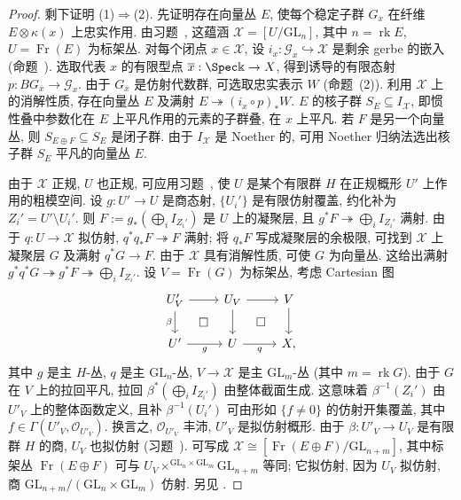 \begin{proof}
剩下证明 (1)$\Rightarrow$(2). 先证明存在向量丛 $E$, 使每个稳定子群 $G_x$ 在纤维 $E\otimes\kappa(x)$ 上忠实作用. 由习题~, 这蕴涵 $\mathcal X=[U/\mathrm{GL}_n]$, 其中 $n=\operatorname{rk}E$, $U=\operatorname{Fr}(E)$ 为标架丛. 对每个闭点 $x\in\mathcal X$, 设 $i_x:\mathcal G_x\hookrightarrow\mathcal X$ 是剩余 gerbe 的嵌入 (命题~). 选取代表 $x$ 的有限型点 $\overline x:\Spec\Bbbk\to\mathcal X$, 得到诱导的有限态射 $p:BG_{\overline x}\to\mathcal G_x$. 由于 $G_{\overline x}$ 是仿射代数群, 可选取忠实表示 $W$ (命题~(2)). 利用 $\mathcal X$ 上的消解性质, 存在向量丛 $E$ 及满射 $E\twoheadrightarrow(i_x\circ p)_*W$. $E$ 的核子群 $S_E\subseteq I_{\mathcal X}$, 即惯性叠中参数化在 $E$ 上平凡作用的元素的子群叠, 在 $x$ 上平凡. 若 $F$ 是另一个向量丛, 则 $S_{E\oplus F}\subseteq S_E$ 是闭子群. 由于 $I_{\mathcal X}$ 是 Noether 的, 可用 Noether 归纳法选出核子群 $S_E$ 平凡的向量丛 $E$.

由于 $\mathcal X$ 正规, $U$ 也正规, 可应用习题~, 使 $U$ 是某个有限群 $H$ 在正规概形 $U'$ 上作用的粗模空间. 设 $g:U'\to U$ 是商态射, $\{U_i'\}$ 是有限仿射覆盖, 约化补为 $Z_i'=U'\setminus U_i'$. 则 $F:=g_*(\bigoplus_iI_{Z_i'})$ 是 $U$ 上的凝聚层, 且 $g^*F\twoheadrightarrow\bigoplus_iI_{Z_i'}$ 满射. 由于 $q:U\to\mathcal X$ 拟仿射, $q^*q_*F\twoheadrightarrow F$ 满射; 将 $q_*F$ 写成凝聚层的余极限, 可找到 $\mathcal X$ 上凝聚层 $G$ 及满射 $q^*G\to F$. 由于 $\mathcal X$ 具有消解性质, 可使 $G$ 为向量丛. 这给出满射 $g^*q^*G\twoheadrightarrow g^*F\twoheadrightarrow\bigoplus_iI_{Z_i'}$. 设 $V=\operatorname{Fr}(G)$ 为标架丛, 考虑 Cartesian 图
\[
\begin{tikzcd}[ampersand replacement=\&]
U'_V\arrow[r]\arrow[d,"{\beta}"']\&U_V\arrow[r]\arrow[d]\&V\arrow[d]\\
U'\arrow[r,"{g}"']\arrow[ur,phantom,"{\square}"]\&U\arrow[r,"{q}"']\arrow[ur,phantom,"{\square}"]\&\mathcal X,
\end{tikzcd}
\]
其中 $g$ 是主 $H$-丛, $q$ 是主 $\mathrm{GL}_n$-丛, $V\to\mathcal X$ 是主 $\mathrm{GL}_m$-丛 (其中 $m=\operatorname{rk}G$). 由于 $G$ 在 $V$ 上的拉回平凡, 拉回 $\beta^*(\bigoplus_iI_{Z_i'})$ 由整体截面生成. 这意味着 $\beta^{-1}(Z_i')$ 由 $U'_V$ 上的整体函数定义, 且补 $\beta^{-1}(U_i')$ 可由形如 $\{f\neq0\}$ 的仿射开集覆盖, 其中 $f\in\Gamma(U'_V,\mathcal O_{U'_V})$. 换言之, $\mathcal O_{U'_V}$ 丰沛, $U'_V$ 是拟仿射概形. 由于 $\beta:U'_V\to U_V$ 是有限群 $H$ 的商, $U_V$ 也拟仿射 (习题~). 可写成 $\mathcal X\cong[\operatorname{Fr}(E\oplus F)/\mathrm{GL}_{n+m}]$, 其中标架丛 $\operatorname{Fr}(E\oplus F)$ 可与 $U_V\times^{\mathrm{GL}_n\times\mathrm{GL}_m}\mathrm{GL}_{n+m}$ 等同; 它拟仿射, 因为 $U_V$ 拟仿射, 商 $\mathrm{GL}_{n+m}/(\mathrm{GL}_n\times\mathrm{GL}_m)$ 仿射. 另见 \cite[定理 1.1]{Tot04}.
\end{proof}

